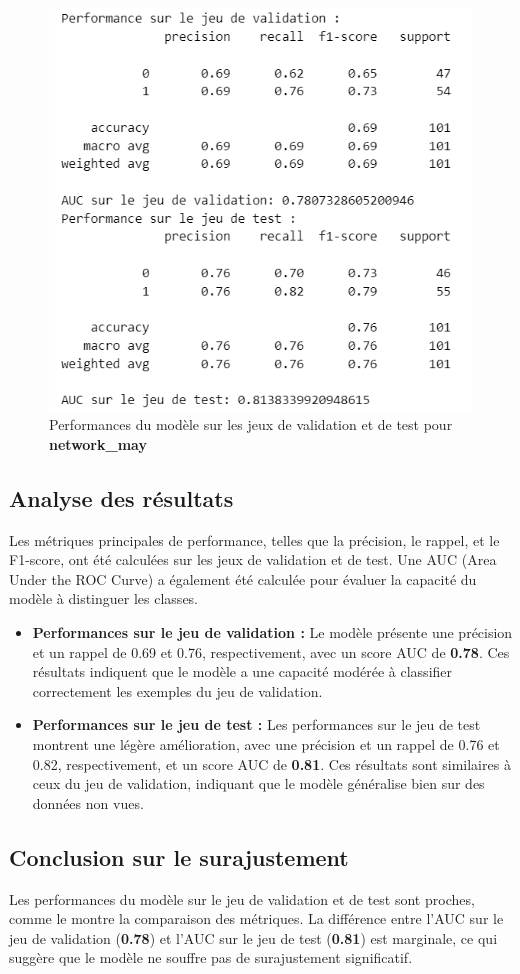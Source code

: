 \begin{figure}[H]
    \centering
    \includegraphics[width=0.6\linewidth]{OVERFIT.png}
    \caption{Performances du modèle sur les jeux de validation et de test pour \textbf{network\_may}}
    \label{fig:overfit}
\end{figure}

\subsection{Analyse des résultats}
Les métriques principales de performance, telles que la précision, le rappel, et le F1-score, ont été calculées sur les jeux de validation et de test. Une AUC (Area Under the ROC Curve) a également été calculée pour évaluer la capacité du modèle à distinguer les classes.

\begin{itemize}
    \item \textbf{Performances sur le jeu de validation :} Le modèle présente une précision et un rappel de 0.69 et 0.76, respectivement, avec un score AUC de \textbf{0.78}. Ces résultats indiquent que le modèle a une capacité modérée à classifier correctement les exemples du jeu de validation.
    \item \textbf{Performances sur le jeu de test :} Les performances sur le jeu de test montrent une légère amélioration, avec une précision et un rappel de 0.76 et 0.82, respectivement, et un score AUC de \textbf{0.81}. Ces résultats sont similaires à ceux du jeu de validation, indiquant que le modèle généralise bien sur des données non vues.
\end{itemize}

\subsection{Conclusion sur le surajustement}
Les performances du modèle sur le jeu de validation et de test sont proches, comme le montre la comparaison des métriques. La différence entre l'AUC sur le jeu de validation (\textbf{0.78}) et l'AUC sur le jeu de test (\textbf{0.81}) est marginale, ce qui suggère que le modèle ne souffre pas de surajustement significatif.

